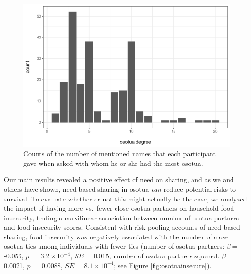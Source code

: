 \documentclass[
]{article}
\begin{document}
\begin{figure}
\centering
\includegraphics{needBasedSharing-paper_files/figure-latex/degosotuaplot-1.pdf}
\caption{\label{fig:degosotuaplot}Counts of the number of mentioned names that each participant gave when asked with whom he or she had the most osotua.}
\end{figure}

Our main results revealed a positive effect of need on sharing, and as we and others have shown, need-based sharing in osotua \emph{can} reduce potential risks to survival. To evaluate whether or not this might actually be the case, we analyzed the impact of having more vs.~fewer close osotua partners on household food insecurity, finding a curvilinear association between number of osotua partners and food insecurity scores. Consistent with risk pooling accounts of need-based sharing, food insecurity was negatively associated with the number of close osotua ties among individuals with fewer ties (number of osotua partners: \(\beta=\) -0.056, \(p=\) \ensuremath{3.2\times 10^{-4}}, \(SE\) = 0.015; number of osotua partners squared: \(\beta=\) 0.0021, \(p=\) 0.0088, \(SE\) = \ensuremath{8.1\times 10^{-4}}; see Figure \ref{fig:osotuainsecure}).
\end{document}
